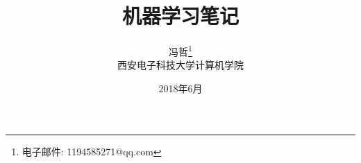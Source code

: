 \documentclass[a4paper, 11pt,UTF8]{ctexart}
\newcommand{\xiaosihao}{\fontsize{12pt}{\baselineskip}\selectfont}
\begin{document}
\begin{CJK}{UTF8}{gbsn}

\newtheorem{example}{例}             %
\newtheorem{algorithm}{算法}
\newtheorem{theorem}{定理}[section]  %
\newtheorem{definition}{定义}
\newtheorem{axiom}{公理}
\newtheorem{property}{性质}
\newtheorem{proposition}{命题}
\newtheorem{lemma}{引理}
\newtheorem{corollary}{推论}
\newtheorem{remark}{注解}
\newtheorem{condition}{条件}
\newtheorem{conclusion}{结论}
\newtheorem{assumption}{假设}

\renewcommand{\contentsname}{目录}  %
\renewcommand{\abstractname}{摘要}  %
\renewcommand{\refname}{参考文献}   %
\renewcommand{\indexname}{索引}
\renewcommand{\figurename}{图}
\renewcommand{\tablename}{表}
\renewcommand{\appendixname}{附录}
\renewcommand{\algorithm}{算法}


\title{机器学习笔记}
\author{冯哲\footnote{电子邮件: 1194585271@qq.com}\\[2ex]
\xiaosihao 西安电子科技大学计算机学院\\[2ex]
}
\date{2018年6月}


\maketitle

\tableofcontents
\newpage








\end{CJK}
\end{document}
